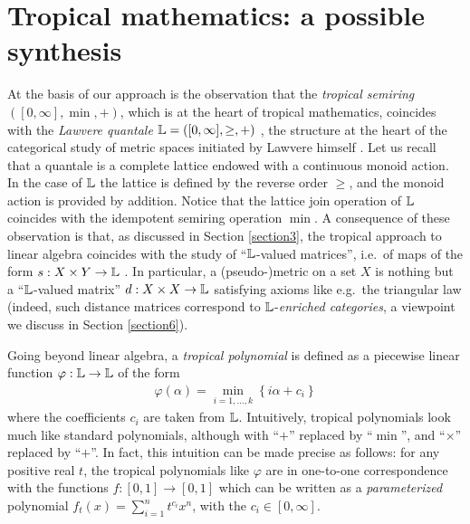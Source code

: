  
\section{Tropical mathematics: a possible synthesis}

At the basis of our approach is the observation that the \emph{tropical semiring} $([0,\infty], \min, +)$, which is at the heart of tropical mathematics, coincides with the \emph{Lawvere quantale} $\mathbb{L}=([0,\infty], \geq, +)$ \cite{}, the structure at the heart of the categorical study of metric spaces initiated by Lawvere himself \cite{}.
Let us recall that a quantale is a complete lattice endowed with a continuous monoid action. In the case of $\mathbb{L}$ the lattice is defined by the reverse order $\geq$, and the monoid action is provided by addition. Notice that the lattice join operation of $\mathbb{L}$ coincides with the idempotent semiring operation $\min$. 
A consequence of these observation is that, as discussed in Section \ref{section3}, the tropical approach to linear algebra coincides with the study of ``$\mathbb{L}$-valued matrices'', i.e.~of maps of the form $s: X\times Y\to \mathbb{L}$ .
In particular, a (pseudo-)metric on a set $X$ is nothing but a ``$\mathbb{L}$-valued matrix'' $d:X\times X\to \mathbb{L}$ satisfying axioms like e.g.~the triangular law (indeed, such distance matrices correspond to $\mathbb{L}$-\emph{enriched categories}, a viewpoint we discuss in Section \ref{section6}). 

Going beyond linear algebra, a \emph{tropical polynomial} is defined as a piecewise linear function $\varphi:\mathbb{L}\to \mathbb{L}$ of the form 
\begin{align}\label{eq:polytrop}
\varphi(\alpha)= \min_{i=1,\dots,k}\left\{ i\alpha + c_{i}\right\}
\end{align}
where the coefficients $c_{i}$ are taken from $\mathbb{L}$. 
%
Intuitively, tropical polynomials look much like standard polynomials, although with ``$+$'' replaced by ``$\min$'', and ``$\times$'' replaced by ``$+$''. 
In fact, this intuition can be made precise as follows: for any positive real $t$, the tropical polynomials like $\varphi$ are in one-to-one correspondence with the functions $f:[0,1]\to [0,1]$ which can be written as a \emph{parameterized} polynomial 
$f_{t}(x)= \sum_{i=1}^{n}t^{c_{i}}x^{n}$, with the $c_{i}\in [0,\infty]$. 







